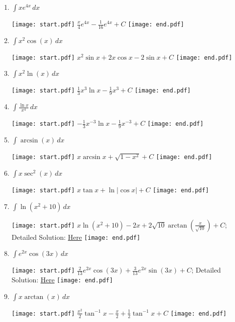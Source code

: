 \documentclass[12pt]{article}
\begin{document}
\begin{enumerate}

\item $\int xe^{4x}\,dx$ 

\texttt{[image: start.pdf]}
{{$\frac{x}{4}e^{4x}-\frac{1}{16}e^{4x}+C$}}
\texttt{[image: end.pdf]}


\item $\int x^2\cos{(x)}\,dx$ 

\texttt{[image: start.pdf]}
{{$x^2\sin{x}+2x\cos{x}-2\sin{x}+C$}}
\texttt{[image: end.pdf]}


\item $\int x^2\ln{(x)}\,dx$ 

\texttt{[image: start.pdf]}
{{$\frac{1}{3}x^3\ln{x}-\frac{1}{9}x^3+C$}}
\texttt{[image: end.pdf]}


\item $\int{\frac{\ln{x}}{x^4}} \,dx$

\texttt{[image: start.pdf]}
{{$-\frac{1}{3}x^{-3}\ln{x}-\frac{1}{9}x^{-3}+C$}}
\texttt{[image: end.pdf]}


\item $\int \arcsin{(x)}\,dx$ 

\texttt{[image: start.pdf]}
{{$x\arcsin{x}+\sqrt{1-x^2}+C$}}
\texttt{[image: end.pdf]}


\item $\int x\sec^2{(x)}\,dx$ 

\texttt{[image: start.pdf]}
{{$x\tan{x}+\ln{|\cos{x}|}+C$}}
\texttt{[image: end.pdf]}


\item $\int \ln{(x^2+10)}\,dx$ 

\texttt{[image: start.pdf]}
{{$x\ln{(x^2+10)}-2x+2\sqrt{10}\arctan{\left(\frac{x}{\sqrt{10}}\right)}+C$; Detailed Solution: \textcolor{blue}{\href{http://www.math.drexel.edu/classes/Calculus/resources/Math122HW/Solutions/122_11_Parts_07.pdf}{Here}}}}
\texttt{[image: end.pdf]}


\item $\int e^{2x}\cos{(3x)}\,dx$ 

\texttt{[image: start.pdf]}
{{$\frac{2}{13}e^{2x}\cos{(3x)}+\frac{3}{13}e^{2x}\sin{(3x)}+C$; Detailed Solution: \textcolor{blue}{\href{http://www.math.drexel.edu/classes/Calculus/resources/Math122HW/Solutions/122_11_Parts_08.pdf}{Here}}}}
\texttt{[image: end.pdf]}


\item $\int x\arctan{(x)}\,dx$

\texttt{[image: start.pdf]}
{{$\frac{x^2}{2}\tan^{-1}x-\frac{x}{2}+\frac{1}{2}\tan^{-1}x+C$}}
\texttt{[image: end.pdf]}



\end{enumerate}
\end{document}
